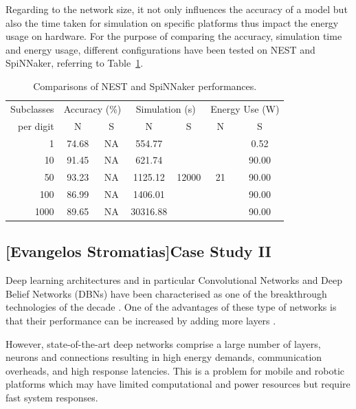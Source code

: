 Regarding to the network size, it not only influences the accuracy of a model but also the time taken for simulation on specific platforms thus impact the energy usage on hardware.
For the purpose of comparing the accuracy, simulation time and energy usage, different configurations have been tested on NEST and SpiNNaker, referring to Table~\ref{tbl:compare}.

\begin{table}[h]
\caption{Comparisons of NEST and SpiNNaker performances.}
\begin{center}
\begin{tabular} {r|c|c|c|c|c|c}
	 Subclasses
	 &\multicolumn{2}{c|}{Accuracy (\%)}  &\multicolumn{2}{c|}{Simulation (s)}
	 &\multicolumn{2}{c}{Energy Use (W)}   \\
	 \cline{2-7}
	 per digit
	& N & S & N & S & N & S\\
    \hline
    1 & 74.68 & NA & 554.77 & \multirow{5}{*}{12000} & \multirow{5}{*}{21} & 0.52 \\
    10 & 91.45 & NA & 621.74 &   &   & 90.00 \\
    50 & 93.23 & NA & 1125.12 &   &   & 90.00 \\
    100 & 86.99 & NA & 1406.01 &   &   & 90.00 \\
    1000 & 89.65 & NA & 30316.88 &   &   & 90.00 \\

\end{tabular}
\label{tbl:compare}
\end{center}
\end{table}


\subsection{[Evangelos Stromatias]Case Study II}
Deep learning architectures and in particular Convolutional Networks \citep{lecun1998gradient} and Deep Belief Networks (DBNs) \citep{Hinton_etal_2006} have been characterised as one of the breakthrough technologies of the decade \citep{MIT_TechReview}. One of the advantages of these type of networks is that their performance can be increased by adding more layers \citep{Hinton_Contr_Divergence2006}.

However, state-of-the-art deep networks comprise a large number of layers, neurons and connections resulting in high energy demands, communication overheads, and high response latencies. This is a problem for mobile and robotic platforms which may have limited computational and power resources but require fast system responses. 


